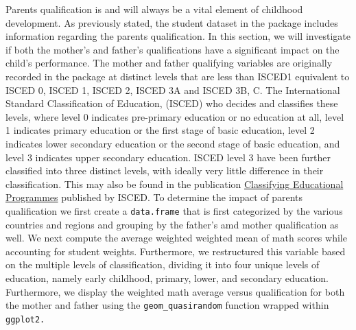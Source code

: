 Parents qualification is and will always be a vital element of childhood
development. As previously stated, the student dataset in the package
includes information regarding the parents qualification. In this
section, we will investigate if both the mother's and father's
qualifications have a significant impact on the child's performance. The
mother and father qualifying variables are originally recorded in the
package at distinct levels that are less than ISCED1 equivalent to ISCED
0, ISCED 1, ISCED 2, ISCED 3A and ISCED 3B, C. The International
Standard Classification of Education, (ISCED) who decides and classifies
these levels, where level 0 indicates pre-primary education or no
education at all, level 1 indicates primary education or the first stage
of basic education, level 2 indicates lower secondary education or the
second stage of basic education, and level 3 indicates upper secondary
education. ISCED level 3 have been further classified into three
distinct levels, with ideally very little difference in their
classification. This may also be found in the publication
\href{https://www.oecd.org/education/1841854.pdf}{Classifying
Educational Programmes} published by ISCED. To determine the impact of
parents qualification we first create a \texttt{data.frame} that is
first categorized by the various countries and regions and grouping by
the father's amd mother qualification as well. We next compute the
average weighted weighted mean of math scores while accounting for
student weights. Furthermore, we restructured this variable based on the
multiple levels of classification, dividing it into four unique levels
of education, namely early childhood, primary, lower, and secondary
education. Furthermore, we display the weighted math average versus
qualification for both the mother and father using the
\texttt{geom\_quasirandom} function wrapped within \texttt{ggplot2.}

